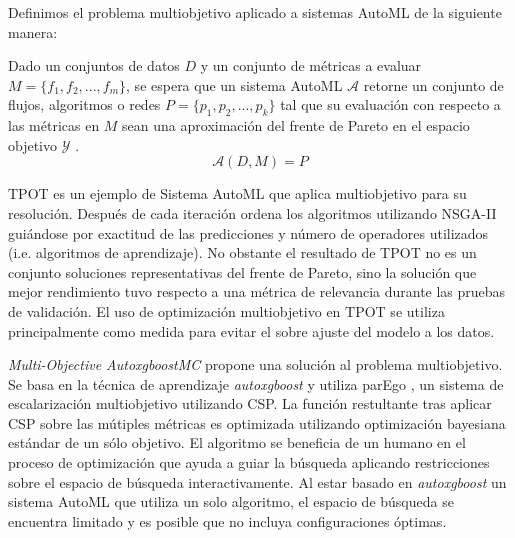 Definimos el problema multiobjetivo aplicado a sistemas AutoML de la siguiente manera:
\begin{definition}\label{background:def:moo-automl-problem}
    Dado un conjuntos de datos $D$ y  un conjunto de m\'etricas a evaluar $M = \{f_1, f_2, ...,f_m\}$, se espera que  un sistema AutoML $\mathcal{A}$ retorne un conjunto de flujos, algoritmos o redes $P = \{p_1, p_2, ..., p_k\}$ tal que su evaluaci\'on con respecto a las m\'etricas en $M$ sean una aproximaci\'on del frente de Pareto en el espacio objetivo $\mathcal{Y}$ .
    \begin{equation*}
        \mathcal{A}(D, M) = P  
    \end{equation*}
\end{definition}

TPOT  es un ejemplo de Sistema AutoML que aplica multiobjetivo para su resoluci\'on. Despu\'es de cada iteraci\'on ordena los algoritmos utilizando NSGA-II  gui\'andose por exactitud de las predicciones y n\'umero de operadores utilizados (i.e. algoritmos de aprendizaje). No obstante el resultado de TPOT no es un conjunto soluciones representativas del frente de Pareto, sino la soluci\'on que mejor rendimiento tuvo respecto a una m\'etrica de relevancia durante las pruebas de validaci\'on. El uso de optimizaci\'on multiobjetivo en TPOT se utiliza principalmente como medida para evitar el sobre ajuste del modelo a los datos.

\textit {Multi-Objective AutoxgboostMC} propone una soluci\'on al problema multiobjetivo. Se basa en la t\'ecnica de aprendizaje \textit{autoxgboost}  y utiliza  parEgo , un sistema de escalarizaci\'on multiobjetivo utilizando CSP. La funci\'on restultante tras aplicar CSP sobre las m\'utiples m\'etricas  es optimizada utilizando optimizaci\'on bayesiana est\'andar de un s\'olo objetivo.
El algoritmo se beneficia de un humano en el proceso de optimizaci\'on que ayuda a guiar la b\'usqueda aplicando restricciones sobre el espacio de b\'usqueda interactivamente.
Al estar basado en \textit{autoxgboost}  un sistema AutoML que utiliza un solo algoritmo, el espacio de b\'usqueda se encuentra limitado y es posible que no incluya configuraciones \'optimas.


